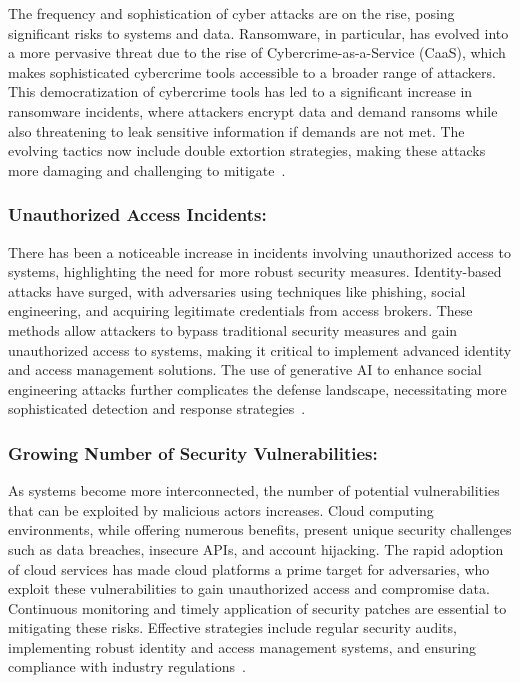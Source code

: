 \documentclass{article}
\begin{document}
    The frequency and sophistication of cyber attacks are on the rise, posing significant risks to systems and data.
    Ransomware, in particular, has evolved into a more pervasive threat due to the rise of Cybercrime-as-a-Service (CaaS), which makes sophisticated cybercrime tools accessible to a broader range of attackers.
    This democratization of cybercrime tools has led to a significant increase in ransomware incidents, where attackers encrypt data and demand ransoms while also threatening to leak sensitive information if demands are not met.
    The evolving tactics now include double extortion strategies, making these attacks more damaging and challenging to mitigate~\cite{cobalt2024}.

    \subsubsection{Unauthorized Access Incidents:}
    There has been a noticeable increase in incidents involving unauthorized access to systems, highlighting the need for more robust security measures.
    Identity-based attacks have surged, with adversaries using techniques like phishing, social engineering, and acquiring legitimate credentials from access brokers.
    These methods allow attackers to bypass traditional security measures and gain unauthorized access to systems, making it critical to implement advanced identity and access management solutions.
    The use of generative AI to enhance social engineering attacks further complicates the defense landscape, necessitating more sophisticated detection and response strategies~\cite{techwire2022}.

    \subsubsection{Growing Number of Security Vulnerabilities:}
    As systems become more interconnected, the number of potential vulnerabilities that can be exploited by malicious actors increases.
    Cloud computing environments, while offering numerous benefits, present unique security challenges such as data breaches, insecure APIs, and account hijacking.
    The rapid adoption of cloud services has made cloud platforms a prime target for adversaries, who exploit these vulnerabilities to gain unauthorized access and compromise data.
    Continuous monitoring and timely application of security patches are essential to mitigating these risks.
    Effective strategies include regular security audits, implementing robust identity and access management systems, and ensuring compliance with industry regulations~\cite{coalition2024}.
\end{document}
